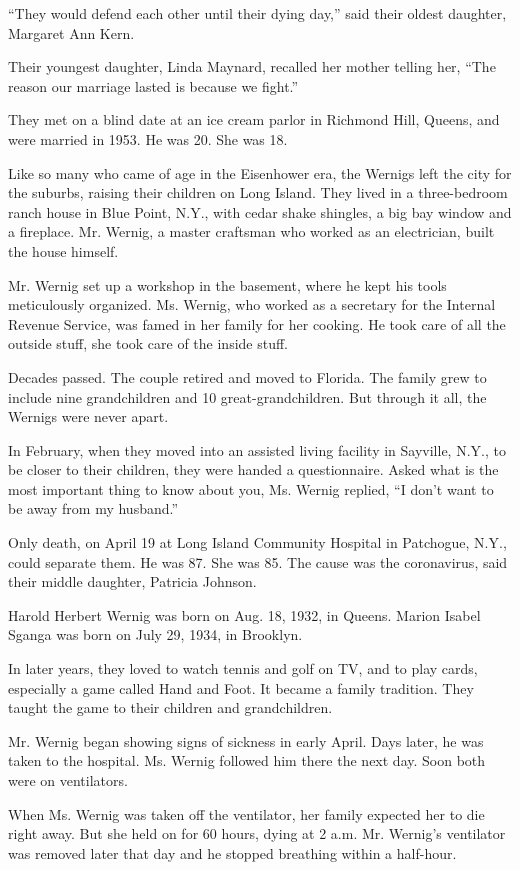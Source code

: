 ``They would defend each other until their dying day,'' said their
oldest daughter, Margaret Ann Kern.

Their youngest daughter, Linda Maynard, recalled her mother telling her,
``The reason our marriage lasted is because we fight.''

They met on a blind date at an ice cream parlor in Richmond Hill,
Queens, and were married in 1953. He was 20. She was 18.

Like so many who came of age in the Eisenhower era, the Wernigs left the
city for the suburbs, raising their children on Long Island. They lived
in a three-bedroom ranch house in Blue Point, N.Y., with cedar shake
shingles, a big bay window and a fireplace. Mr. Wernig, a master
craftsman who worked as an electrician, built the house himself.

Mr. Wernig set up a workshop in the basement, where he kept his tools
meticulously organized. Ms. Wernig, who worked as a secretary for the
Internal Revenue Service, was famed in her family for her cooking. He
took care of all the outside stuff, she took care of the inside stuff.

Decades passed. The couple retired and moved to Florida. The family grew
to include nine grandchildren and 10 great-grandchildren. But through it
all, the Wernigs were never apart.

In February, when they moved into an assisted living facility in
Sayville, N.Y., to be closer to their children, they were handed a
questionnaire. Asked what is the most important thing to know about you,
Ms. Wernig replied, ``I don't want to be away from my husband.''

Only death, on April 19 at Long Island Community Hospital in Patchogue,
N.Y., could separate them. He was 87. She was 85. The cause was the
coronavirus, said their middle daughter, Patricia Johnson.

Harold Herbert Wernig was born on Aug. 18, 1932, in Queens. Marion
Isabel Sganga was born on July 29, 1934, in Brooklyn.

In later years, they loved to watch tennis and golf on TV, and to play
cards, especially a game called Hand and Foot. It became a family
tradition. They taught the game to their children and grandchildren.

Mr. Wernig began showing signs of sickness in early April. Days later,
he was taken to the hospital. Ms. Wernig followed him there the next
day. Soon both were on ventilators.

When Ms. Wernig was taken off the ventilator, her family expected her to
die right away. But she held on for 60 hours, dying at 2 a.m. Mr.
Wernig's ventilator was removed later that day and he stopped breathing
within a half-hour.

